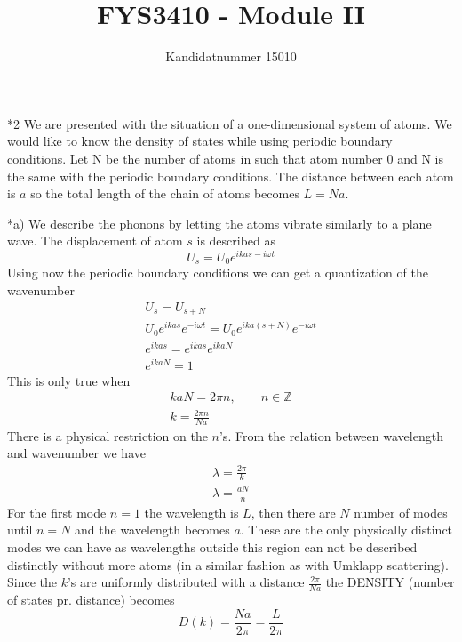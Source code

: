 \documentclass[a4paper]{article}
\author{Kandidatnummer 15010}
\title{FYS3410 - Module II}
\begin{document}
\maketitle

\begin{section}*2
We are presented with the situation of a one-dimensional system of atoms. We would like to know the density of states while using periodic boundary conditions. Let N be the number of atoms in such that atom number 0 and N is the same with the periodic boundary conditions. The distance between each atom is $a$ so the total length of the chain of atoms becomes $L=Na$.
	\begin{subsection}*{a)}
		We describe the phonons by letting the atoms vibrate similarly to a plane wave. The displacement of atom $s$ is described as 
		$$ U_s = U_0 e^{ikas-i\omega t} $$
		Using now the periodic boundary conditions we can get a quantization of the wavenumber
		\begin{align*}
			U_s = U_{s+N}\\
			U_0e^{ikas}e^{-i\omega t} = U_0e^{ika(s+N)}e^{-i\omega t}\\
			e^{ikas} = e^{ikas}e^{ikaN}\\
			e^{ikaN} = 1
		\end{align*}
		This is only true when
		\begin{align*}
			kaN=2 \pi n,\qquad n\in \mathbb{Z}\\
			k = \frac{2\pi n}{Na}
		\end{align*}
		There is a physical restriction on the $n$'s. From the relation between wavelength and wavenumber we have
		\begin{align*}
			\lambda = \frac{2\pi}{k}\\
			\lambda = \frac{aN}{n}
		\end{align*}
		For the first mode $n=1$ the wavelength is $L$, then there are $N$ number of modes until $n=N$ and the wavelength becomes $a$. These are the only physically distinct modes we can have as wavelengths outside this region can not be described distinctly without more atoms (in a similar fashion as with Umklapp scattering).
		Since the $k$'s are uniformly distributed with a distance $\frac{2\pi}{Na}$ the DENSITY (number of states pr. distance) becomes
		$$D(k) = \frac{Na}{2\pi} = \frac{L}{2\pi}$$


\end{subsection}
\end{section}
\end{document}

